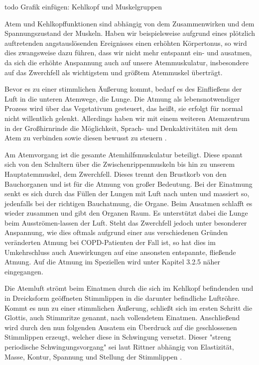 todo Grafik einfügen: Kehlkopf und Muskelgruppen

Atem und Kehlkopffunktionen sind abhängig von dem Zusammenwirken und dem Spannungszustand der Muskeln. Haben wir beispielsweise aufgrund eines plötzlich auftretenden angstauslösenden Ereignisses einen erhöhten Körpertonus, so wird dies zwangsweise dazu führen, dass wir nicht mehr entspannt ein- und ausatmen, da sich die erhöhte Anspannung auch auf unsere Atemmuskulatur, insbesondere auf das Zwerchfell als wichtigstem und größtem Atemmuskel überträgt. 

Bevor es zu einer stimmlichen Äußerung kommt, bedarf es des Einfließens der Luft in die unteren Atemwege, die Lunge. Die Atmung als lebensnotwendiger Prozess wird über das Vegetativum gesteuert, das heißt, sie erfolgt für normal nicht willentlich gelenkt. Allerdings haben wir mit einem weiteren Atemzentrum in der Großhirnrinde die Möglichkeit, Sprach- und Denkaktivitäten mit dem Atem zu verbinden sowie diesen bewusst zu steuern \autocite[vgl.][2]{ehrmann2004}. 

Am Atemvorgang ist die gesamte Atemhilfsmuskulatur beteiligt. Diese spannt sich von den Schultern über die Zwischenrippenmuskeln bis hin zu unserem Hauptatemmuskel, dem Zwerchfell. Dieses trennt den Brustkorb von den Bauchorganen und ist für die Atmung von großer Bedeutung. Bei der Einatmung senkt es sich durch das Füllen der Lungen mit Luft nach unten und massiert so, jedenfalls bei der richtigen Bauchatmung, die Organe. Beim Ausatmen schlafft es wieder zusammen und gibt den Organen Raum. Es unterstützt dabei die Lunge beim Ausströmen-lassen der Luft. Steht das Zwerchfell jedoch unter besonderer Anspannung, wie dies oftmals aufgrund einer aus verschiedenen Gründen veränderten Atmung bei COPD-Patienten der Fall ist, so hat dies im Umkehrschluss auch Auswirkungen auf eine ansonsten entspannte, fließende Atmung. Auf die Atmung im Speziellen wird unter Kapitel 3.2.5 näher eingegangen. 

Die Atemluft strömt beim Einatmen durch die sich im Kehlkopf befindenden und in Dreicksform geöffneten Stimmlippen in die darunter befindliche Luftröhre. Kommt es nun zu einer stimmlichen Äußerung, schließt sich im ersten Schritt die Glottis, auch Stimmritze genannt, nach vollendetem Einatmen. Anschließend wird durch den nun folgenden Ausatem ein Überdruck auf die geschlossenen Stimmlippen erzeugt, welcher diese in Schwingung versetzt. Dieser "streng periodische Schwingungsvorgang" \autocite[481]{rittner2009a} sei laut Rittner abhängig von Elastizität, Masse, Kontur, Spannung und Stellung der Stimmlippen \autocite[vgl.][481]{rittner2009a}.

